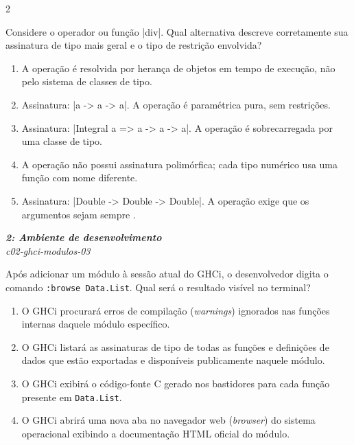 \documentclass[a4paper,10pt,brazil]{article}
\begin{document}
\begin{multicols}{2}
\begin{flushright}
\end{flushright}
Considere o operador ou função \haskellinline|div|. Qual alternativa descreve corretamente sua assinatura de tipo mais geral e o tipo de restrição envolvida?
\begin{enumerate}
  \item A operação é resolvida por herança de objetos em tempo de execução, não pelo sistema de classes de tipo.
  \item Assinatura: \haskellinline|a -> a -> a|. A operação é paramétrica pura, sem restrições.
  \item Assinatura: \haskellinline|Integral a => a -> a -> a|. A operação é sobrecarregada por uma classe de tipo.
  \item A operação não possui assinatura polimórfica; cada tipo numérico usa uma função com nome diferente.
  \item Assinatura: \haskellinline|Double -> Double -> Double|. A operação exige que os argumentos sejam sempre .

\end{enumerate}

\begin{flushright}
  \footnotesize
  \textit{\textbf{2: Ambiente de desenvolvimento}}\\
  \textit{c02-ghci-modulos-03}\\

\end{flushright}
Após adicionar um módulo à sessão atual do GHCi, o desenvolvedor digita o comando \texttt{:browse Data.List}. Qual será o resultado visível no terminal?

\begin{enumerate}
  \item O GHCi procurará erros de compilação (\emph{warnings}) ignorados nas funções internas daquele módulo específico.

  \item O GHCi listará as assinaturas de tipo de todas as funções e definições de dados que estão exportadas e disponíveis publicamente naquele módulo.

  \item O GHCi exibirá o código-fonte C gerado nos bastidores para cada função presente em \texttt{Data.List}.

  \item O GHCi abrirá uma nova aba no navegador web (\emph{browser}) do sistema operacional exibindo a documentação HTML oficial do módulo.


\end{enumerate}
\end{multicols}
\end{document}

